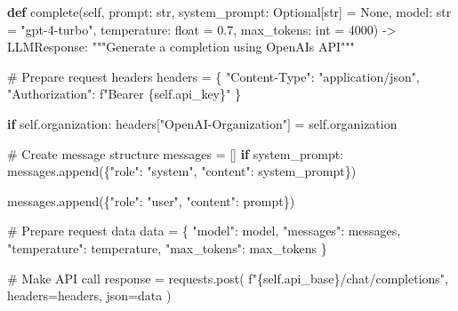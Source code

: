 \documentclass[
  11pt,
  letterpaper,
]{book}
\newenvironment{Shaded}{\begin{snugshade}}{\end{snugshade}}
\newcommand{\BuiltInTok}[1]{\textcolor[rgb]{0.00,0.23,0.31}{#1}}
\newcommand{\CommentTok}[1]{\textcolor[rgb]{0.37,0.37,0.37}{#1}}
\newcommand{\ControlFlowTok}[1]{\textcolor[rgb]{0.00,0.23,0.31}{\textbf{#1}}}
\newcommand{\DecValTok}[1]{\textcolor[rgb]{0.68,0.00,0.00}{#1}}
\newcommand{\FloatTok}[1]{\textcolor[rgb]{0.68,0.00,0.00}{#1}}
\newcommand{\KeywordTok}[1]{\textcolor[rgb]{0.00,0.23,0.31}{\textbf{#1}}}
\newcommand{\NormalTok}[1]{\textcolor[rgb]{0.00,0.23,0.31}{#1}}
\newcommand{\OperatorTok}[1]{\textcolor[rgb]{0.37,0.37,0.37}{#1}}
\newcommand{\SpecialCharTok}[1]{\textcolor[rgb]{0.37,0.37,0.37}{#1}}
\newcommand{\SpecialStringTok}[1]{\textcolor[rgb]{0.13,0.47,0.30}{#1}}
\newcommand{\StringTok}[1]{\textcolor[rgb]{0.13,0.47,0.30}{#1}}
\newcommand{\VariableTok}[1]{\textcolor[rgb]{0.07,0.07,0.07}{#1}}
\begin{document}
\begin{Shaded}
\begin{Highlighting}[]
    \KeywordTok{def}\NormalTok{ complete(}\VariableTok{self}\NormalTok{,}
\NormalTok{                prompt: }\BuiltInTok{str}\NormalTok{,}
\NormalTok{                system\_prompt: Optional[}\BuiltInTok{str}\NormalTok{] }\OperatorTok{=} \VariableTok{None}\NormalTok{,}
\NormalTok{                model: }\BuiltInTok{str} \OperatorTok{=} \StringTok{"gpt{-}4{-}turbo"}\NormalTok{,}
\NormalTok{                temperature: }\BuiltInTok{float} \OperatorTok{=} \FloatTok{0.7}\NormalTok{,}
\NormalTok{                max\_tokens: }\BuiltInTok{int} \OperatorTok{=} \DecValTok{4000}\NormalTok{) }\OperatorTok{{-}\textgreater{}}\NormalTok{ LLMResponse:}
        \CommentTok{"""Generate a completion using OpenAI\textquotesingle{}s API"""}

        \CommentTok{\# Prepare request headers}
\NormalTok{        headers }\OperatorTok{=}\NormalTok{ \{}
            \StringTok{"Content{-}Type"}\NormalTok{: }\StringTok{"application/json"}\NormalTok{,}
            \StringTok{"Authorization"}\NormalTok{: }\SpecialStringTok{f"Bearer }\SpecialCharTok{\{}\VariableTok{self}\SpecialCharTok{.}\NormalTok{api\_key}\SpecialCharTok{\}}\SpecialStringTok{"}
\NormalTok{        \}}

        \ControlFlowTok{if} \VariableTok{self}\NormalTok{.organization:}
\NormalTok{            headers[}\StringTok{"OpenAI{-}Organization"}\NormalTok{] }\OperatorTok{=} \VariableTok{self}\NormalTok{.organization}

        \CommentTok{\# Create message structure}
\NormalTok{        messages }\OperatorTok{=}\NormalTok{ []}
        \ControlFlowTok{if}\NormalTok{ system\_prompt:}
\NormalTok{            messages.append(\{}\StringTok{"role"}\NormalTok{: }\StringTok{"system"}\NormalTok{, }\StringTok{"content"}\NormalTok{: system\_prompt\})}

\NormalTok{        messages.append(\{}\StringTok{"role"}\NormalTok{: }\StringTok{"user"}\NormalTok{, }\StringTok{"content"}\NormalTok{: prompt\})}

        \CommentTok{\# Prepare request data}
\NormalTok{        data }\OperatorTok{=}\NormalTok{ \{}
            \StringTok{"model"}\NormalTok{: model,}
            \StringTok{"messages"}\NormalTok{: messages,}
            \StringTok{"temperature"}\NormalTok{: temperature,}
            \StringTok{"max\_tokens"}\NormalTok{: max\_tokens}
\NormalTok{        \}}

        \CommentTok{\# Make API call}
\NormalTok{        response }\OperatorTok{=}\NormalTok{ requests.post(}
            \SpecialStringTok{f"}\SpecialCharTok{\{}\VariableTok{self}\SpecialCharTok{.}\NormalTok{api\_base}\SpecialCharTok{\}}\SpecialStringTok{/chat/completions"}\NormalTok{,}
\NormalTok{            headers}\OperatorTok{=}\NormalTok{headers,}
\NormalTok{            json}\OperatorTok{=}\NormalTok{data}
\NormalTok{        )}


\end{Highlighting}
\end{Shaded}
\end{document}
